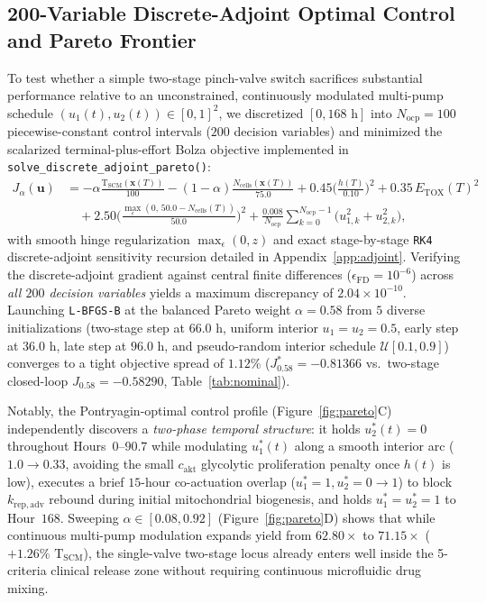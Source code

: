 \documentclass[11pt]{article}
\theoremstyle{plain}
\theoremstyle{remark}
\begin{document}
\subsection{200-Variable Discrete-Adjoint Optimal Control and Pareto Frontier}
To test whether a simple two-stage pinch-valve switch sacrifices substantial performance relative to an unconstrained, continuously modulated multi-pump schedule $(u_1(t), u_2(t)) \in [0, 1]^2$, we discretized $[0, 168\text{ h}]$ into $N_{\mathrm{ocp}} = 100$ piecewise-constant control intervals ($200$ decision variables) and minimized the scalarized terminal-plus-effort Bolza objective implemented in \texttt{solve\_discrete\_adjoint\_pareto()}:
\begin{align}
  J_\alpha(\mathbf{u}) &= -\alpha\frac{\mathrm{T}_{\mathrm{SCM}}(\mathbf{x}(T))}{100} - (1 - \alpha)\frac{N_{\mathrm{cells}}(\mathbf{x}(T))}{75.0} + 0.45\Big(\frac{h(T)}{0.10}\Big)^2 + 0.35\,E_{\mathrm{TOX}}(T)^2 \nonumber\\
  &\quad + 2.50\Big(\frac{\max_\epsilon(0,\, 50.0 - N_{\mathrm{cells}}(T))}{50.0}\Big)^2 + \frac{0.008}{N_{\mathrm{ocp}}}\sum_{k=0}^{N_{\mathrm{ocp}}-1}\big(u_{1,k}^2 + u_{2,k}^2\big),
  \label{eq:bolza}
\end{align}
with smooth hinge regularization $\max_\epsilon(0, z)$ and exact stage-by-stage \texttt{RK4} discrete-adjoint sensitivity recursion detailed in Appendix~\ref{app:adjoint}. Verifying the discrete-adjoint gradient against central finite differences ($\epsilon_{\mathrm{FD}} = 10^{-6}$) across \emph{all $200$ decision variables} yields a maximum discrepancy of $2.04 \times 10^{-10}$. Launching \texttt{L-BFGS-B} at the balanced Pareto weight $\alpha = 0.58$ from $5$ diverse initializations (two-stage step at $66.0\text{ h}$, uniform interior $u_1 = u_2 = 0.5$, early step at $36.0\text{ h}$, late step at $96.0\text{ h}$, and pseudo-random interior schedule $\mathcal{U}[0.1, 0.9]$) converges to a tight objective spread of $1.12\%$ ($J_{0.58}^* = -0.81366$ vs.\ two-stage closed-loop $J_{0.58} = -0.58290$, Table~\ref{tab:nominal}).

Notably, the Pontryagin-optimal control profile (Figure~\ref{fig:pareto}C) independently discovers a \emph{two-phase temporal structure}: it holds $u_2^*(t) = 0$ throughout Hours~$0\text{--}90.7$ while modulating $u_1^*(t)$ along a smooth interior arc ($1.0 \to 0.33$, avoiding the small $c_{\mathrm{akt}}$ glycolytic proliferation penalty once $h(t)$ is low), executes a brief $15\text{-hour}$ co-actuation overlap ($u_1^* = 1, u_2^* = 0 \to 1$) to block $k_{\mathrm{rep,adv}}$ rebound during initial mitochondrial biogenesis, and holds $u_1^* = u_2^* = 1$ to Hour~$168$. Sweeping $\alpha \in [0.08, 0.92]$ (Figure~\ref{fig:pareto}D) shows that while continuous multi-pump modulation expands yield from $62.80\times$ to $71.15\times$ ($+1.26\%$ $\mathrm{T}_{\mathrm{SCM}}$), the single-valve two-stage locus already enters well inside the 5-criteria clinical release zone without requiring continuous microfluidic drug mixing.
\end{document}
